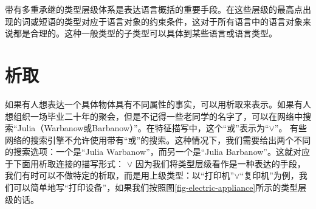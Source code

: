 带有多重承继的类型层级体系是表达语言概括的重要手段。在这些层级的最高点出现的词或短语的类型对应于语言对象的约束条件，这对于所有语言中的语言对象来说都是合理的。这种一般类型的子类型可以具体到某些语言或语言类型。

\section{析取}

如果有人想表达一个具体物体具有不同属性的事实，可以用析取来表示。如果有人想组织一场毕业二十年的聚会，但是不记得一些老同学的名字了，可以在网络中搜索“Julia（Warbanow或Barbanow）”。在特征描写中，这个“或”表示为“$\vee$”。
\ea
\ms[人]{
名  & julia\\
姓  & warbanow $\vee$ barbanow
}
\z
有些网络的搜索引擎不允许使用带有“或”的搜索。这种情况下，我们需要给出两个不同的搜索选项：一个是“Julia Warbanow”，而另一个是“Julia Barbanow”。这就对应于下面用析取连接的描写形式：
\ea
\ms[人]{
名  & julia\\
姓  & warbanow
} $\vee $
\ms[人]{
名  & julia\\
姓  & barbanow
}
\z
因为我们将类型层级看作是一种表达的手段，我们有时可以不做特定的析取，而是用上级类型：以“打印机”$\vee$“复印机”为例，我们可以简单地写“打印设备”，如果我们按照图\vref{fig-electric-appliance}所示的类型层级的话。

